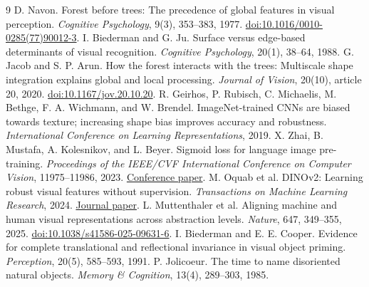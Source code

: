 \documentclass[11pt]{article}
\begin{document}
\begin{thebibliography}{9}
 D. Navon. Forest before trees: The precedence of global features in visual perception. \emph{Cognitive Psychology}, 9(3), 353--383, 1977. \href{https://doi.org/10.1016/0010-0285(77)90012-3}{doi:10.1016/0010-0285(77)90012-3}.
 I. Biederman and G. Ju. Surface versus edge-based determinants of visual recognition. \emph{Cognitive Psychology}, 20(1), 38--64, 1988.
 G. Jacob and S. P. Arun. How the forest interacts with the trees: Multiscale shape integration explains global and local processing. \emph{Journal of Vision}, 20(10), article 20, 2020. \href{https://doi.org/10.1167/jov.20.10.20}{doi:10.1167/jov.20.10.20}.
 R. Geirhos, P. Rubisch, C. Michaelis, M. Bethge, F. A. Wichmann, and W. Brendel. ImageNet-trained CNNs are biased towards texture; increasing shape bias improves accuracy and robustness. \emph{International Conference on Learning Representations}, 2019.
 X. Zhai, B. Mustafa, A. Kolesnikov, and L. Beyer. Sigmoid loss for language image pre-training. \emph{Proceedings of the IEEE/CVF International Conference on Computer Vision}, 11975--11986, 2023. \href{https://openaccess.thecvf.com/content/ICCV2023/html/Zhai_Sigmoid_Loss_for_Language_Image_Pre-Training_ICCV_2023_paper.html}{Conference paper}.
 M. Oquab et al. DINOv2: Learning robust visual features without supervision. \emph{Transactions on Machine Learning Research}, 2024. \href{https://openreview.net/forum?id=a68SUt6zFt}{Journal paper}.
 L. Muttenthaler et al. Aligning machine and human visual representations across abstraction levels. \emph{Nature}, 647, 349--355, 2025. \href{https://doi.org/10.1038/s41586-025-09631-6}{doi:10.1038/s41586-025-09631-6}.
 I. Biederman and E. E. Cooper. Evidence for complete translational and reflectional invariance in visual object priming. \emph{Perception}, 20(5), 585--593, 1991.
 P. Jolicoeur. The time to name disoriented natural objects. \emph{Memory \& Cognition}, 13(4), 289--303, 1985.
\end{thebibliography}
\end{document}
